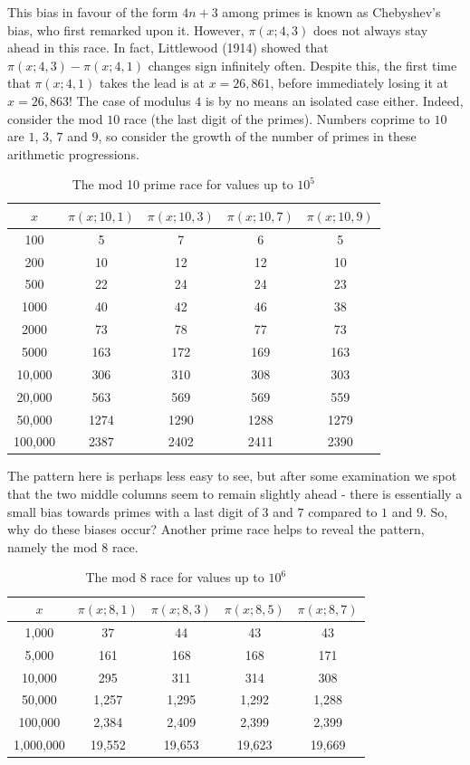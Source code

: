 This bias in favour of the form $4n + 3$ among primes is known as Chebyshev's bias, who first remarked upon it. However, $\pi(x; 4, 3)$ does not always stay ahead in this race. In fact, Littlewood (1914) showed that $\pi(x; 4, 3) - \pi(x; 4, 1)$ changes sign infinitely often. Despite this, the first time that $\pi(x; 4, 1)$ takes the lead is at $x = 26,861$, before immediately losing it at $x = 26,863$! The case of modulus $4$ is by no means an isolated case either. Indeed, consider the mod $10$ race (the last digit of the primes). Numbers coprime to $10$ are $1$, $3$, $7$ and $9$, so consider the growth of the number of primes in these arithmetic progressions.
\begin{table}[H]
    \centering
    \begin{tabular}{|c|c|c|c|c|}
    \hline
       $x$ & $\pi(x; 10, 1)$ & $\pi(x; 10, 3)$ & $\pi(x; 10, 7)$ & $\pi(x; 10, 9)$ \\
       \hline
        100 & 5 & 7 & 6 & 5 \\
        200 & 10 & 12 & 12 & 10 \\
        500 & 22 & 24 & 24 & 23 \\
        1000 & 40 & 42 & 46 & 38 \\
        2000 & 73 & 78 & 77 & 73 \\
        5000 & 163 & 172 & 169 & 163 \\
        10,000 & 306 & 310 & 308 & 303 \\
        20,000 & 563 & 569 & 569 & 559 \\
        50,000 & 1274 & 1290 & 1288 & 1279 \\
        100,000 & 2387 & 2402 & 2411 & 2390 \\
        \hline
    \end{tabular}
    \caption{The mod 10 prime race for values up to $10^{5}$}
\end{table}
The pattern here is perhaps less easy to see, but after some examination we spot that the two middle columns seem to remain slightly ahead - there is essentially a small bias towards primes with a last digit of $3$ and $7$ compared to $1$ and $9$. So, why do these biases occur? Another prime race helps to reveal the pattern, namely the mod $8$ race. 
\begin{table}[H]
    \centering
    \begin{tabular}{|c|c|c|c|c|}
    \hline
        $x$ & $\pi(x; 8, 1)$ & $\pi(x; 8, 3)$ & $\pi(x; 8, 5)$ & $\pi(x; 8, 7)$\\
        \hline
        1,000 & 37 & 44 & 43 & 43 \\
        5,000 & 161 & 168 & 168 & 171 \\
        10,000 & 295 & 311 & 314 & 308 \\
        50,000 & 1,257 & 1,295 & 1,292 & 1,288 \\
        100,000 & 2,384 & 2,409 & 2,399 & 2,399 \\
        1,000,000 & 19,552 & 19,653 & 19,623 & 19,669 \\
        \hline
    \end{tabular}
    \caption{The mod 8 race for values up to $10^{6}$}
\end{table}
